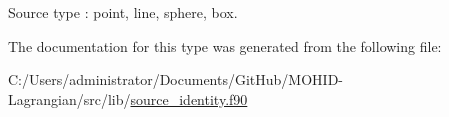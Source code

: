 Source type \+: \textquotesingle{}point\textquotesingle{}, \textquotesingle{}line\textquotesingle{}, \textquotesingle{}sphere\textquotesingle{}, \textquotesingle{}box\textquotesingle{}. 



The documentation for this type was generated from the following file\+:\begin{DoxyCompactItemize}
\item 
C\+:/\+Users/administrator/\+Documents/\+Git\+Hub/\+M\+O\+H\+I\+D-\/\+Lagrangian/src/lib/\mbox{\hyperlink{source__identity_8f90}{source\+\_\+identity.\+f90}}\end{DoxyCompactItemize}
